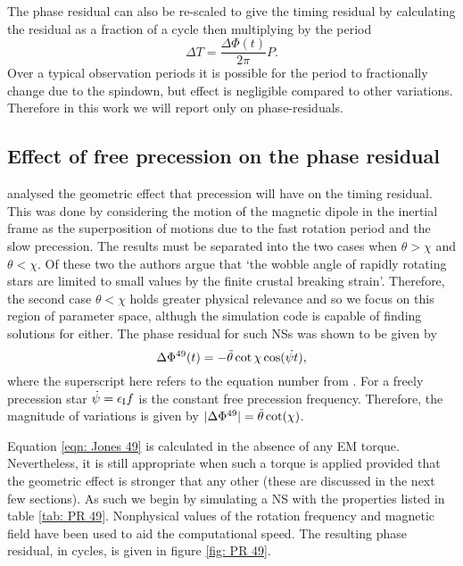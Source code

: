\documentclass[../full_thesis/full_thesis.tex]{subfiles}
\begin{document}
The phase residual can also be re-scaled to give the timing residual by
calculating the residual as a fraction of a cycle then multiplying by the
period
\begin{equation}
    \Delta T = \frac{\Delta\Phi(t)}{2\pi} P.
    \label{eqn: phase to timing}
\end{equation}
Over a typical observation periods it is possible for the period to
fractionally change due to the spindown, but effect is negligible compared to
other variations. Therefore in this work we will report only on
phase-residuals.

\subsection{Effect of free precession on the phase residual}

\citet{Jones2001} analysed the geometric effect that precession will have on
the timing residual. This was done by considering the motion of the magnetic
dipole in the inertial frame as the superposition of motions due to the fast
rotation period and the slow precession. The results must be separated into the
two cases when $\theta > \chi$ and $\theta < \chi$. Of these two the authors
argue that `the wobble angle  of rapidly rotating stars are limited to small
values by the finite crustal breaking strain'. Therefore, the second case
$\theta < \chi$ holds greater physical relevance and so we focus on this region
of parameter space, althugh the simulation code is capable of finding solutions
for either. The phase residual for such NSs was shown to be given by
\begin{equation}
    \Delta\Phi^{49}(t) = -\tilde{\theta} \cot\chi\cos(\dot{\psi t}),
    \label{eqn: Jones 49}
\end{equation}
where the superscript here refers to the equation number from \citet{Jones2001}.
For a freely precession star $\dot{\psi}=\epsilon_{\mathrm{I}} f$ is the constant free
precession frequency. Therefore, the magnitude of variations is given by
$|\Delta\Phi^{49}|=\tilde{\theta} \cot(\chi)$.

Equation \eqref{eqn: Jones 49} is calculated in the absence of any EM torque.
Nevertheless, it is still appropriate when such a torque is applied provided
that the geometric effect is stronger that any other (these are discussed in
the next few sections). As such we begin by simulating a NS with the properties
listed in table \ref{tab: PR 49}. Nonphysical values of the
rotation frequency and magnetic field have been used to aid the computational
speed. The resulting phase residual, in cycles, is given in figure \ref{fig:
PR 49}.
\end{document}

